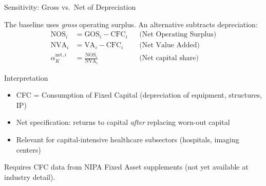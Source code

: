 \begin{frame}{Sensitivity: Gross vs.\ Net of Depreciation}

The baseline uses \emph{gross} operating surplus. An alternative subtracts depreciation:
%
\begin{align*}
    \text{NOS}_i &= \text{GOS}_i - \text{CFC}_i & &\text{(Net Operating Surplus)} \\[3pt]
    \text{NVA}_i &= \text{VA}_i - \text{CFC}_i & &\text{(Net Value Added)} \\[3pt]
    \alpha_K^{\text{net},i} &= \frac{\text{NOS}_i}{\text{NVA}_i} & &\text{(Net capital share)}
\end{align*}

\begin{block}{Interpretation}
\begin{itemize}
    \item CFC = Consumption of Fixed Capital (depreciation of equipment, structures, IP)
    \item Net specification: returns to capital \emph{after} replacing worn-out capital
    \item Relevant for capital-intensive healthcare subsectors (hospitals, imaging centers)
\end{itemize}
\end{block}

{\footnotesize Requires CFC data from NIPA Fixed Asset supplements (not yet available at industry detail).}

\end{frame}

